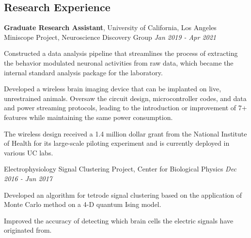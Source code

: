 \documentclass[margin,line]{./templates/resume}
\begin{document}
\begin{resume}
\section{\mysidestyle Research Experience}
\textbf{Graduate Research Assistant}, University of California, Los Angeles\\
Miniscope Project, Neuroscience Discovery Group \hfill \textsl{Jan 2019 - Apr 2021}

\begin{list2}
    \item {Constructed a data analysis pipeline that streamlines the process of extracting the behavior modulated neuronal activities from raw data, which became the internal standard analysis package for the laboratory.}
    \item {Developed a wireless brain imaging device that can be implanted on live, unrestrained animals. Oversaw the circuit design, microcontroller codes, and data and power streaming protocols, leading to the introduction or improvement of 7+ features while maintaining the same power consumption.}
    \item {The wireless design received a 1.4 million dollar grant from the National Institute of Health for its large-scale piloting experiment and is currently deployed in various UC labs.}
\end{list2}



Electrophysiology Signal Clustering Project, Center for Biological Physics \hfill \textsl{Dec 2016 - Jun 2017}

\begin{list2}
    \item {Developed an algorithm for tetrode signal clustering based on the application of Monte Carlo method on a 4-D quantum Ising model.}
    \item {Improved the accuracy of detecting which brain cells the electric signals have originated from.}
\end{list2}


\end{resume}
\end{document}
